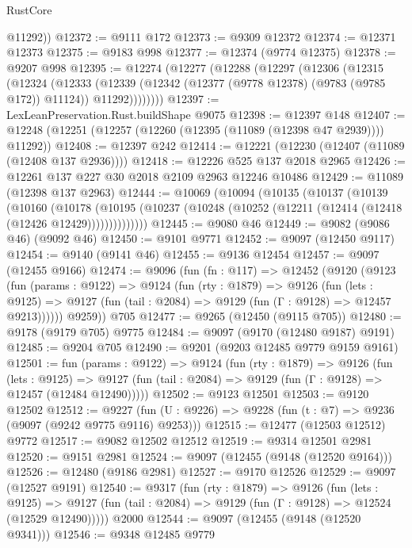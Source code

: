 \begin{lexlean}{RustCore}
\begin{coremodule}
        @11292))
@12372 := @9111 @172
@12373 := @9309 @12372
@12374 := @12371 @12373
@12375 := @9183 @998
@12377 := @12374 (@9774 @12375)
@12378 := @9207 @998
@12395 := @12274
    (@12277
      (@12288
        (@12297
          (@12306
            (@12315
              (@12324
                (@12333
                  (@12339
                    (@12342 (@12377 (@9778 @12378) (@9783 (@9785 @172)) @11124))
                    @11292))))))))
@12397 := LexLeanPreservation.Rust.buildShape @9075
@12398 := @12397 @148
@12407 := @12248 (@12251 (@12257 (@12260 (@12395 (@11089 (@12398 @47 @2939)))) @11292))
@12408 := @12397 @242
@12414 := @12221 (@12230 (@12407 (@11089 (@12408 @137 @2936))))
@12418 := @12226 @525 @137 @2018 @2965
@12426 := @12261 @137 @227 @30 @2018 @2109 @2963 @12246 @10486
@12429 := @11089 (@12398 @137 @2963)
@12444 := @10069
    (@10094
      (@10135
        (@10137
          (@10139
            (@10160
              (@10178
                (@10195 (@10237 (@10248 (@10252 (@12211 (@12414 (@12418 (@12426 @12429))))))))))))))
@12445 := @9080 @46
@12449 := @9082 (@9086 @46) (@9092 @46)
@12450 := @9101 @9771
@12452 := @9097 (@12450 @9117)
@12454 := @9140 (@9141 @46)
@12455 := @9136 @12454
@12457 := @9097 (@12455 @9166)
@12474 := @9096
    (fun (fn : @117) =>
    @12452
      (@9120
        (@9123
          (fun (params : @9122) =>
          @9124
            (fun (rty : @1879) =>
            @9126
              (fun (lets : @9125) =>
              @9127 (fun (tail : @2084) => @9129 (fun (Γ : @9128) => @12457 @9213))))))
        @9259))
    @705
@12477 := @9265 (@12450 (@9115 @705))
@12480 := @9178 (@9179 @705) @9775
@12484 := @9097 (@9170 (@12480 @9187) @9191)
@12485 := @9204 @705
@12490 := @9201 (@9203 @12485 @9779 @9159 @9161)
@12501 := fun (params : @9122) =>
  @9124
    (fun (rty : @1879) =>
    @9126
      (fun (lets : @9125) =>
      @9127 (fun (tail : @2084) => @9129 (fun (Γ : @9128) => @12457 (@12484 @12490)))))
@12502 := @9123 @12501
@12503 := @9120 @12502
@12512 := @9227 (fun (U : @9226) => @9228 (fun (t : @7) => @9236 (@9097 (@9242 @9775 @9116) @9253)))
@12515 := @12477 (@12503 @12512) @9772
@12517 := @9082 @12502 @12512
@12519 := @9314 @12501 @2981
@12520 := @9151 @2981
@12524 := @9097 (@12455 (@9148 (@12520 @9164)))
@12526 := @12480 (@9186 @2981)
@12527 := @9170 @12526
@12529 := @9097 (@12527 @9191)
@12540 := @9317
    (fun (rty : @1879) =>
    @9126
      (fun (lets : @9125) =>
      @9127 (fun (tail : @2084) => @9129 (fun (Γ : @9128) => @12524 (@12529 @12490)))))
    @2000
@12544 := @9097 (@12455 (@9148 (@12520 @9341)))
@12546 := @9348 @12485 @9779

\end{coremodule}
\end{lexlean}
